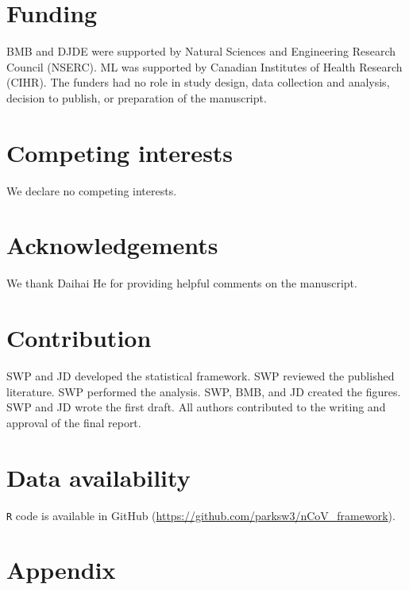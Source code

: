 \documentclass[12pt]{article}
\begin{document}
\pagebreak

\section*{Funding}

BMB and DJDE were supported by Natural Sciences and Engineering Research Council (NSERC). ML was supported by Canadian Institutes of Health Research (CIHR). The funders had no role in study design, data collection and analysis, decision to publish, or preparation of the manuscript.

\section*{Competing interests}

We declare no competing interests.

\section*{Acknowledgements}

We thank Daihai He for providing helpful comments on the manuscript.

\section*{Contribution}

SWP and JD developed the statistical framework. 
SWP reviewed the published literature.
SWP performed the analysis. 
SWP, BMB, and JD created the figures. 
SWP and JD wrote the first draft.
All authors contributed to the writing and approval of the final report.

\section*{Data availability}

\texttt{R} code is available in GitHub (\url{https://github.com/parksw3/nCoV_framework}).


\pagebreak



\pagebreak
\appendix
\renewcommand\thefigure{A\arabic{figure}}
\setcounter{figure}{0}    
\section*{Appendix}
\end{document}
